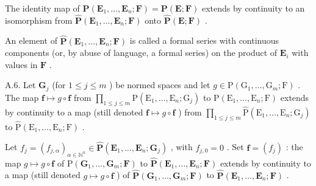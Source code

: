 The identity map of \(\mathbf{P}(\mathbf{E}_{1},\ldots,\mathbf{E}_{n};\mathbf{F})=\mathbf{P}(\mathbf{E};\mathbf{F})\) extends by continuity to an isomorphism from \(\hat{\mathbf{P}}(\mathbf{E}_{1},\ldots,\mathbf{E}_{n};\mathbf{F})\) onto \(\hat{\mathbf{P}}(\mathbf{E};\mathbf{F})\) .

An element of \(\hat{\mathbf{P}}(\mathbf{E}_{1},\ldots,\mathbf{E}_{n};\mathbf{F})\) is called a formal series with continuous components (or, by abuse of language, a formal series) on the product of \(\mathbf{E}_{i}\) with values in \(\mathbf{F}\) .

A.6. Let \(\mathbf{G}_j\) (for \(1 \leqslant j \leqslant m\) ) be normed spaces and let \(g \in \mathrm{P}(\mathrm{G}_1, \ldots, \mathrm{G}_m; \mathrm{F})\) . The map \(\mathbf{f} \mapsto g \circ \mathbf{f}\) from \(\prod_{1 \leqslant j \leqslant m} \mathrm{P}(\mathrm{E}_1, \ldots, \mathrm{E}_n; \mathrm{G}_j)\) to \(\mathrm{P}(\mathrm{E}_1, \ldots, \mathrm{E}_n; \mathrm{F})\) extends by continuity to a map (still denoted \(\mathbf{f} \mapsto g \circ \mathbf{f}\) ) from \(\prod_{1 \leqslant j \leqslant m} \hat{\mathrm{P}}(\mathrm{E}_1, \ldots, \mathrm{E}_n; \mathrm{G}_j)\) to \(\hat{\mathrm{P}}(\mathrm{E}_1, \ldots, \mathrm{E}_n; \mathrm{F})\) .

Let \(f_j = (f_{j,\alpha})_{\alpha \in \mathbb{N}^n} \in \hat{\mathbf{P}}(\mathbf{E}_1, \ldots, \mathbf{E}_n; \mathbf{G}_j)\) , with \(f_{j,0} = 0\) . Set \(\mathbf{f} = (f_j)\) : the map \(g \mapsto g \circ \mathbf{f}\) of \(\mathrm{P}(\mathbf{G}_1, \ldots, \mathbf{G}_m; \mathbf{F})\) to \(\hat{\mathbf{P}}(\mathbf{E}_1, \ldots, \mathbf{E}_n; \mathbf{F})\) extends by continuity to a map (still denoted \(g \mapsto g \circ \mathbf{f}\) ) of \(\hat{\mathbf{P}}(\mathbf{G}_1, \ldots, \mathbf{G}_m; \mathbf{F})\) to \(\hat{\mathbf{P}}(\mathbf{E}_1, \ldots, \mathbf{E}_n; \mathbf{F})\) .


